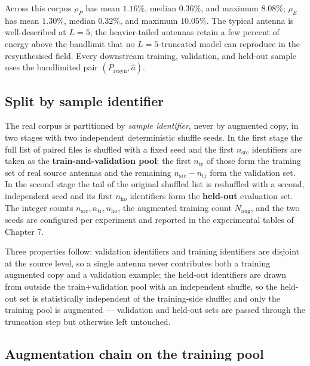 \documentclass[
  english,
  11pt,
]{report}
\begin{document}
Across this corpus \(\rho_P\) has mean \(1.16\%\), median \(0.36\%\),
and maximum \(8.08\%\); \(\rho_E\) has mean \(1.30\%\), median
\(0.32\%\), and maximum \(10.05\%\). The typical antenna is
well-described at \(L = 5\); the heavier-tailed antennas retain a few
percent of energy above the bandlimit that no \(L = 5\)-truncated model
can reproduce in the resynthesised field. Every downstream training,
validation, and held-out sample uses the bandlimited pair
\((P_\mathrm{resyn}, \hat a)\).

\subsection{Split by sample
identifier}\label{split-by-sample-identifier}

The real corpus is partitioned by \emph{sample identifier}, never by
augmented copy, in two stages with two independent deterministic shuffle
seeds. In the first stage the full list of paired files is shuffled with
a fixed seed and the first \(n_\mathrm{src}\) identifiers are taken as
the \textbf{train-and-validation pool}; the first \(n_\mathrm{tr}\) of
those form the training set of real source antennas and the remaining
\(n_\mathrm{src} - n_\mathrm{tr}\) form the validation set. In the
second stage the tail of the original shuffled list is reshuffled with a
second, independent seed and its first \(n_\mathrm{ho}\) identifiers
form the \textbf{held-out} evaluation set. The integer counts
\(n_\mathrm{src}, n_\mathrm{tr}, n_\mathrm{ho}\), the augmented training
count \(N_\mathrm{aug}\), and the two seeds are configured per
experiment and reported in the experimental tables of Chapter 7.

Three properties follow: validation identifiers and training identifiers
are disjoint at the source level, so a single antenna never contributes
both a training augmented copy and a validation example; the held-out
identifiers are drawn from outside the train+validation pool with an
independent shuffle, so the held-out set is statistically independent of
the training-side shuffle; and only the training pool is augmented ---
validation and held-out sets are passed through the truncation step but
otherwise left untouched.

\subsection{Augmentation chain on the training
pool}\label{augmentation-chain-on-the-training-pool}
\end{document}
